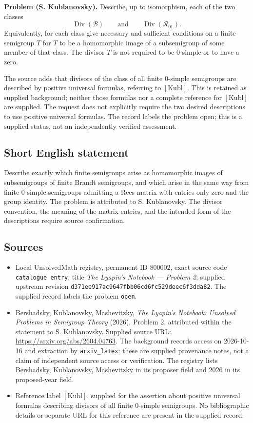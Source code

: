 \documentclass[11pt]{article}
\begin{document}
\textbf{Problem (S. Kublanovsky).} Describe, up to isomorphism, each of the two classes
\[
\operatorname{Div}(\mathcal B)
\qquad\text{and}\qquad
\operatorname{Div}(\mathcal R_{01}).
\]
Equivalently, for each class give necessary and sufficient conditions on a finite semigroup \(T\) for \(T\) to be a homomorphic image of a subsemigroup of some member of that class. The divisor \(T\) is not required to be \(0\)-simple or to have a zero.

The source adds that divisors of the class of all finite \(0\)-simple semigroups are described by positive universal formulas, referring to \([\mathrm{Kubl}]\). This is retained as supplied background; neither those formulas nor a complete reference for \([\mathrm{Kubl}]\) are supplied. The request does not explicitly require the two desired descriptions to use positive universal formulas. The record labels the problem open; this is a supplied status, not an independently verified assessment.
\subsection{Short English statement}
Describe exactly which finite semigroups arise as homomorphic images of subsemigroups of finite Brandt semigroups, and which arise in the same way from finite \(0\)-simple semigroups admitting a Rees matrix with entries only zero and the group identity. The problem is attributed to S. Kublanovsky. The divisor convention, the meaning of the matrix entries, and the intended form of the descriptions require source confirmation.
\subsection{Sources}
\begin{itemize}
\item Local UnsolvedMath registry, permanent ID \(800002\), exact source code \texttt{catalogue entry}, title \emph{The Lyapin's Notebook --- Problem 2}; supplied upstream revision \texttt{d371ee917ac9647fbb06cd6fc529deec6f3dda82}. The supplied record labels the problem \texttt{open}.
\item Bershadsky, Kublanovsky, Mashevitzky, \emph{The Lyapin's Notebook: Unsolved Problems in Semigroup Theory} (2026), Problem 2, attributed within the statement to S. Kublanovsky. Supplied source URL: \url{https://arxiv.org/abs/2604.04763}. The background records access on 2026-10-16 and extraction by \texttt{arxiv\_latex}; these are supplied provenance notes, not a claim of independent source access or verification. The registry lists Bershadsky, Kublanovsky, Mashevitzky in its proposer field and 2026 in its proposed-year field.
\item Reference label \([\mathrm{Kubl}]\), supplied for the assertion about positive universal formulas describing divisors of all finite \(0\)-simple semigroups. No bibliographic details or separate URL for this reference are present in the supplied record.
\end{itemize}
\end{document}
